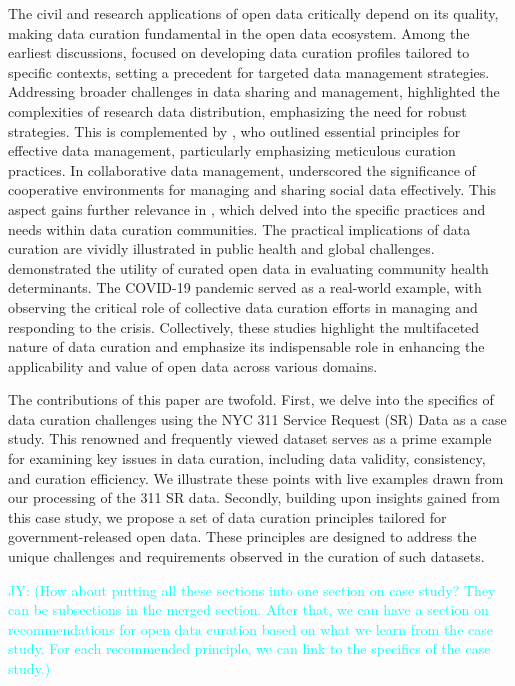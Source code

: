 \documentclass[linenumber]{jdsart}
\newcommand{\jy}[1]{\textcolor{cyan}{JY: (#1)}}
\begin{document}
The civil and research applications of open data critically depend on
its quality, making data curation fundamental in the open data
ecosystem. Among the earliest discussions,
\citet{witt2009constructing} focused on developing data curation
profiles tailored to specific contexts, setting a precedent for
targeted data management strategies. Addressing broader challenges in
data sharing and management, \citet{borgman2012conundrum} highlighted
the complexities of research data distribution, emphasizing the need
for robust strategies. This is complemented by \citet{hart2016ten},
who outlined essential principles for effective data management,
particularly emphasizing meticulous curation practices. In
collaborative data management, \citet{beheshti2019datasynapse}
underscored the significance of cooperative environments for managing
and sharing social data effectively. This aspect gains further
relevance in \citet{mclure2014data}, which delved into the specific
practices and needs within data curation communities. The practical
implications of data curation are vividly illustrated in public health
and global challenges. \citet{cantor2018facets} demonstrated the
utility of curated open data in evaluating community health
determinants. The COVID-19 pandemic served as a real-world example,
with \citet{shankar2021data} observing the critical role of collective
data curation efforts in managing and responding to the
crisis. Collectively, these studies highlight the multifaceted nature
of data curation and emphasize its indispensable role in enhancing the
applicability and value of open data across various domains.


The contributions of this paper are twofold. First, we delve into
the specifics of data curation challenges using the NYC 311 Service
Request (SR) Data as a case study. This renowned and frequently viewed 
dataset serves as a prime example for examining key issues in data curation, 
including data validity, consistency, and curation efficiency. 
We illustrate these points with live examples drawn from our 
processing of the 311 SR data. Secondly, building upon insights 
gained from this case study, we propose a set of data curation 
principles tailored for government-released open data. These 
principles are designed to address the unique challenges 
and requirements observed in the curation of such datasets.

\jy{How about putting all these sections into one section on case
  study? They can be subsections in the merged section.
  After that, we can have a section on recommendations for open
  data curation based on what we learn from the case study. For each
  recommended principle, we can link to the specifics of the case
  study.}
\end{document}
